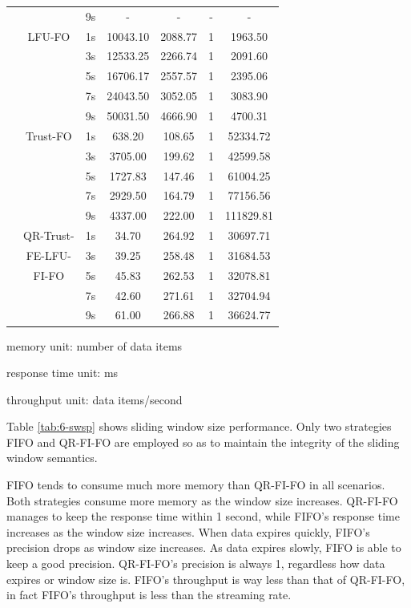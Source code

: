 \begin{center}
\begin{longtable}{|c||c||c|c|c|c|c|}
			   &       & 9s & - & - & - & - \\ \cline{2-7}
			   & LFU-FO & 1s & 10043.10 & 2088.77 & 1 & 1963.50 \\ \cline{3-7}
			   &		& 3s & 12533.25 & 2266.74 & 1 & 2091.60 \\ \cline{3-7}
			   &        & 5s & 16706.17 & 2557.57 & 1 & 2395.06 \\ \cline{3-7}
			   &        & 7s & 24043.50 & 3052.05 & 1 & 3083.90 \\ \cline{3-7}
			   &        & 9s & 50031.50 & 4666.90 & 1 & 4700.31 \\ \cline{2-7}
			   & Trust-FO & 1s & 638.20 & 108.65 & 1& 52334.72 \\ \cline{3-7}
			   &			 & 3s & 3705.00 & 199.62 & 1& 42599.58 \\ \cline{3-7}
			   &             & 5s & 1727.83 & 147.46 & 1& 61004.25 \\ \cline{3-7}
			   &             & 7s & 2929.50 & 164.79 & 1& 77156.56 \\ \cline{3-7}
			   &          & 9s & 4337.00 & 222.00 & 1& 111829.81 \\ \cline{2-7}
              & QR-Trust- & 1s & 34.70 & 264.92 & 1 & 30697.71 \\ \cline{3-7}
			  &	FE-LFU-   & 3s & 39.25 & 258.48 & 1 & 31684.53 \\ \cline{3-7}
			  & FI-FO     & 5s & 45.83 & 262.53 & 1 & 32078.81 \\ \cline{3-7}
			  &           & 7s & 42.60 & 271.61 & 1 & 32704.94 \\ \cline{3-7}
			  &           & 9s & 61.00 & 266.88 & 1 & 36624.77 \\
\end{longtable}
    \begin{tablenotes}
 		\item memory unit: number of data items
 		\item response time unit: ms
 		\item throughput unit: data items/second
    \end{tablenotes}
\end{center}

Table \ref{tab:6-swsp} shows sliding window size performance. 
Only two strategies FIFO and QR-FI-FO are employed so as to maintain the integrity of the sliding window semantics. 

FIFO tends to consume much more memory than QR-FI-FO in all scenarios. 
Both strategies consume more memory as the window size increases. 
QR-FI-FO manages to keep the response time within 1 second, while FIFO's response time increases as the window size increases. 
When data expires quickly, FIFO's precision drops as window size increases.
As data expires slowly, FIFO is able to keep a good precision. 
QR-FI-FO's precision is always 1, regardless how data expires or window size is. 
FIFO's throughput is way less than that of QR-FI-FO, in fact FIFO's throughput is less than the streaming rate.


